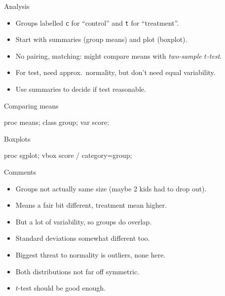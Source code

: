\documentclass[unknownkeysallowed]{beamer}\usepackage[]{graphicx}\usepackage[]{color}
\begin{document}
\begin{frame}[fragile]{Analysis}

  \begin{itemize}
    \item Groups labelled \texttt{c} for ``control'' and \texttt{t}
      for ``treatment''.
    \item Start with summaries (group means) and plot (boxplot).
  \item No pairing, matching: might compare means with \emph{two-sample $t$-test}.
  \item For test, need approx.\ normality, but don't need equal variability.
    \item Use summaries to decide if test reasonable.

  \end{itemize}
  
\end{frame}

\begin{frame}[fragile]{Comparing means}

\begin{Sascode}[store=if]
  proc means;
    class group;
    var score;
\end{Sascode}

  
\end{frame}

\begin{frame}[fragile]{Boxplots}

\begin{Sascode}[store=ifx]
  proc sgplot;
    vbox score / category=group;
\end{Sascode}


  
\end{frame}

\begin{frame}{Comments}

\begin{itemize}
\item Groups not actually same size (maybe 2 kids had to drop out).
\item Means a fair bit different, treatment mean higher.
\item But a lot of variability, so groups do overlap.
\item Standard deviations somewhat different too.
  \item Biggest threat to normality is outliers, none here.
  \item Both distributions not far off symmetric.
  \item $t$-test should be good enough.
  \end{itemize}
  
\end{frame}
\end{document}
